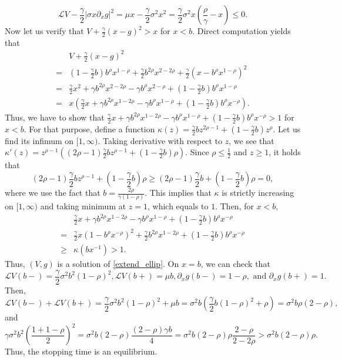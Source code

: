 \documentclass[11pt]{article}
\begin{document}
$$
\mathcal L V-\frac{\gamma}{2}\left|\sigma x \partial_x g\right|^2=\mu x-\frac\gamma2\sigma^2 x^2=\frac\gamma2\sigma^2 x(\frac{\rho}{\gamma}-x) \le 0.
$$
Now let us verify that $V+\frac{\gamma}{2}(x-g)^2 >x$ for $x<b$. Direct computation yields that 
\begin{equation*}
\begin{split}
    &V+\frac{\gamma}{2}(x-g)^2\\
    =&(1-\frac{\gamma}{2}b)b^\rho x^{1-\rho}+\frac{\gamma}{2}b^{2\rho}x^{2-2\rho}+\frac{\gamma}{2}(x-b^\rho x^{1-\rho})^2\\
    =&\frac{\gamma}{2}x^2+\gamma b^{2\rho}x^{2-2\rho}-\gamma b^{\rho}x^{2-\rho}+(1-\frac{\gamma}{2}b)b^\rho x^{1-\rho}\\
    =&x\left(\frac{\gamma}{2} x+\gamma b^{2\rho}x^{1-2\rho} -\gamma b^{\rho}x^{1-\rho}+(1-\frac{\gamma}{2}b)b^{\rho}x^{-\rho}\right).
\end{split}
\end{equation*}
Thus, we have to show that $\frac{\gamma}{2} x+\gamma b^{2\rho}x^{1-2\rho} -\gamma b^{\rho}x^{1-\rho}+(1-\frac{\gamma}{2}b)b^{\rho}x^{-\rho}>1$ for $x<b$. For that purpose, define a function $\kappa(z)=\frac\gamma 2b z^{2\rho-1}+(1-\frac\gamma 2b)z^\rho$. Let us find its infimum on $[1,\infty)$. Taking derivative with respect to $z$, we see that $\kappa'(z)=z^{\rho-1}((2\rho-1)\frac\gamma 2 b z^{\rho-1}+(1-\frac \gamma 2 b)\rho)$. Since $\rho\le \frac12$ and $z\ge 1$, it holds that 
$$
(2\rho-1)\frac\gamma 2 b z^{\rho-1}+(1-\frac \gamma 2 b)\rho\ge (2\rho-1)\frac\gamma 2 b+ (1-\frac \gamma 2 b)\rho=0,
$$
where we use the fact that $b=\frac{2\rho}{\gamma(1-\rho)}$.
This implies that $\kappa$ is strictly increasing on $[1,\infty)$ and taking minimum at $z=1$, which equals to $1$. Then,  for $x<b$, 
\begin{equation*}
\begin{split}
&\frac{\gamma}{2} x+\gamma b^{2\rho}x^{1-2\rho} -\gamma b^{\rho}x^{1-\rho}+(1-\frac{\gamma}{2}b)b^{\rho}x^{-\rho}\\
=&\frac{\gamma}{2}x(1-b^\rho x^{-\rho})^2+\frac\gamma 2b^{2\rho}x^{1-2\rho}+(1-\frac\gamma2b)b^\rho x^{-\rho}\\
\ge &\kappa(bx^{-1})>1.
\end{split}
\end{equation*}
Thus, $(V,g)$ is a solution of  \eqref{extend_ellip}. On $x=b$, we can check that  
$$
\mathcal L V(b-)=\frac\gamma2 \sigma^2 b^2(1-\rho)^2 , \mathcal LV(b+)=\mu b, \partial_x g(b-)=1-\rho,\text{ and } \partial_xg(b+)=1. 
$$
Then,
$$
\mathcal L V(b-)+\mathcal LV(b+)=\frac\gamma2 \sigma^2 b^2(1-\rho)^2+\mu b=\sigma^2b(\frac \gamma 2 b(1-\rho)^2+\rho)=\sigma^2b\rho(2-\rho),
$$
and 
$$
\gamma \sigma^2b^2\left(\frac{1+1-\rho}{2}\right)^2=\sigma^2b(2-\rho)\frac{(2-\rho)\gamma b}{4}=\sigma^2b(2-\rho)\rho\frac{2-\rho}{2-2\rho}>\sigma^2b(2-\rho)\rho. 
$$
Thus,  the stopping time is an equilibrium.
\end{document}
